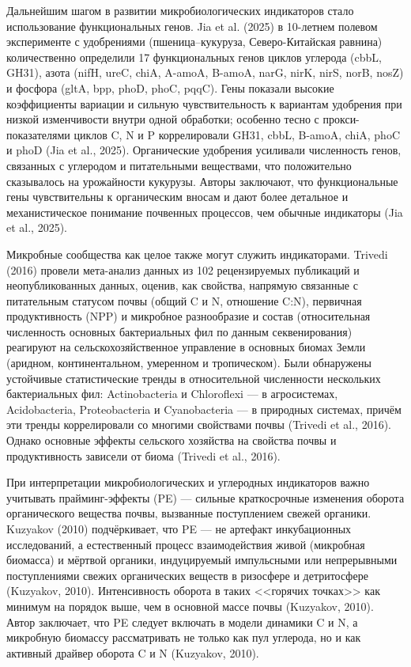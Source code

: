 \documentclass[11pt,a4paper]{article}
\begin{document}
Дальнейшим шагом в развитии микробиологических индикаторов стало использование
функциональных генов. Jia et al. (2025) в 10-летнем полевом эксперименте с
удобрениями (пшеница--кукуруза, Северо-Китайская равнина) количественно
определили 17 функциональных генов циклов углерода (cbbL, GH31), азота (nifH,
ureC, chiA, A-amoA, B-amoA, narG, nirK, nirS, norB, nosZ) и фосфора (gltA, bpp,
phoD, phoC, pqqC). Гены показали высокие коэффициенты вариации и сильную
чувствительность к вариантам удобрения при низкой изменчивости внутри одной
обработки; особенно тесно с прокси-показателями циклов C, N и P коррелировали
GH31, cbbL, B-amoA, chiA, phoC и phoD (Jia et al., 2025). Органические
удобрения усиливали численность генов, связанных с углеродом и питательными
веществами, что положительно сказывалось на урожайности кукурузы. Авторы
заключают, что функциональные гены чувствительны к органическим вносам и дают
более детальное и механистическое понимание почвенных процессов, чем обычные
индикаторы (Jia et al., 2025).

Микробные сообщества как целое также могут служить индикаторами. Trivedi
(2016) провели мета-анализ данных из 102 рецензируемых публикаций и неопубликованных данных, оценив, как
свойства, напрямую связанные с питательным статусом почвы (общий C и N,
отношение C:N), первичная продуктивность (NPP) и микробное разнообразие и
состав (относительная численность основных бактериальных фил по данным
секвенирования) реагируют на сельскохозяйственное управление в основных
биомах Земли (аридном, континентальном, умеренном и тропическом). Были
обнаружены устойчивые статистические тренды в относительной численности
нескольких бактериальных фил: Actinobacteria и Chloroflexi --- в агросистемах,
Acidobacteria, Proteobacteria и Cyanobacteria --- в природных системах, причём
эти тренды коррелировали со многими свойствами почвы (Trivedi et al., 2016). Однако основные эффекты сельского хозяйства на свойства почвы и
продуктивность зависели от биома (Trivedi et al., 2016).

При интерпретации микробиологических и углеродных индикаторов важно учитывать
прайминг-эффекты (PE) --- сильные краткосрочные изменения оборота органического
вещества почвы, вызванные поступлением свежей органики. Kuzyakov (2010)
подчёркивает, что PE --- не артефакт инкубационных исследований, а естественный
процесс взаимодействия живой (микробная биомасса) и мёртвой органики,
индуцируемый импульсными или непрерывными поступлениями свежих органических
веществ в ризосфере и детритосфере (Kuzyakov, 2010). Интенсивность
оборота в таких <<горячих точках>> как минимум на порядок выше, чем в основной
массе почвы (Kuzyakov, 2010). Автор заключает, что PE следует включать в
модели динамики C и N, а микробную биомассу рассматривать не только как пул
углерода, но и как активный драйвер оборота C и N (Kuzyakov, 2010).
\end{document}
